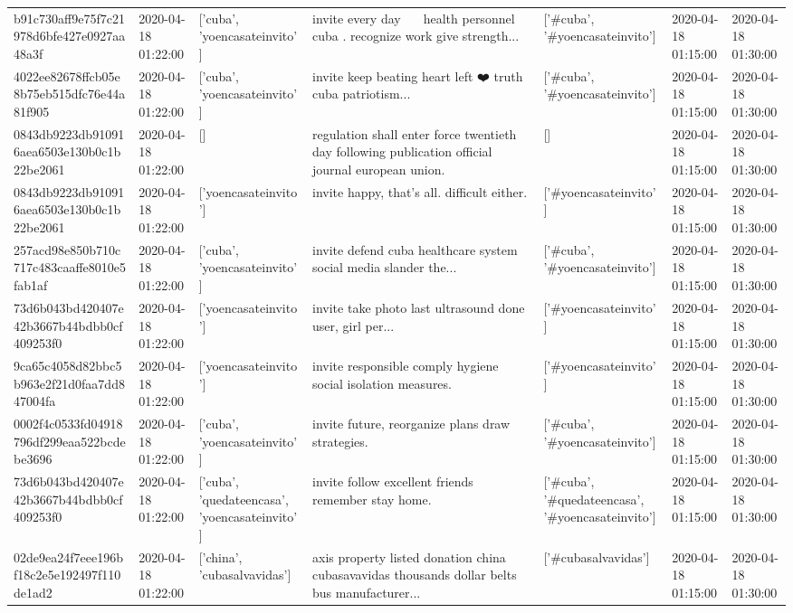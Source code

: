 \begin{tabular}{lllllll}
b91c730aff9e75f7c21978d6bfe427e0927aa48a3f & 2020-04-18 01:22:00 & ['cuba', 'yoencasateinvito'] & invite every day 👏👏👏👏 health personnel cuba ️. recognize work give strength... & ['#cuba', '#yoencasateinvito'] & 2020-04-18 01:15:00 & 2020-04-18 01:30:00 \\
4022ee82678ffcb05e8b75eb515dfc76e44a81f905 & 2020-04-18 01:22:00 & ['cuba', 'yoencasateinvito'] & invite keep beating heart left ❤️ truth cuba patriotism... & ['#cuba', '#yoencasateinvito'] & 2020-04-18 01:15:00 & 2020-04-18 01:30:00 \\
0843db9223db910916aea6503e130b0c1b22be2061 & 2020-04-18 01:22:00 & [] & regulation shall enter force twentieth day following publication official journal european union. & [] & 2020-04-18 01:15:00 & 2020-04-18 01:30:00 \\
0843db9223db910916aea6503e130b0c1b22be2061 & 2020-04-18 01:22:00 & ['yoencasateinvito'] & invite happy, that's all. difficult either. & ['#yoencasateinvito'] & 2020-04-18 01:15:00 & 2020-04-18 01:30:00 \\
257acd98e850b710c717c483caaffe8010e5fab1af & 2020-04-18 01:22:00 & ['cuba', 'yoencasateinvito'] & invite defend cuba healthcare system social media slander the... & ['#cuba', '#yoencasateinvito'] & 2020-04-18 01:15:00 & 2020-04-18 01:30:00 \\
73d6b043bd420407e42b3667b44bdbb0cf409253f0 & 2020-04-18 01:22:00 & ['yoencasateinvito'] & invite take photo last ultrasound done user, girl per... & ['#yoencasateinvito'] & 2020-04-18 01:15:00 & 2020-04-18 01:30:00 \\
9ca65c4058d82bbc5b963e2f21d0faa7dd847004fa & 2020-04-18 01:22:00 & ['yoencasateinvito'] & invite responsible comply hygiene social isolation measures. & ['#yoencasateinvito'] & 2020-04-18 01:15:00 & 2020-04-18 01:30:00 \\
0002f4c0533fd04918796df299eaa522bcdebe3696 & 2020-04-18 01:22:00 & ['cuba', 'yoencasateinvito'] & invite future, reorganize plans draw strategies. & ['#cuba', '#yoencasateinvito'] & 2020-04-18 01:15:00 & 2020-04-18 01:30:00 \\
73d6b043bd420407e42b3667b44bdbb0cf409253f0 & 2020-04-18 01:22:00 & ['cuba', 'quedateencasa', 'yoencasateinvito'] & invite follow excellent friends remember stay home. & ['#cuba', '#quedateencasa', '#yoencasateinvito'] & 2020-04-18 01:15:00 & 2020-04-18 01:30:00 \\
02de9ea24f7eee196bf18c2e5e192497f110de1ad2 & 2020-04-18 01:22:00 & ['china', 'cubasalvavidas'] & axis property listed donation china cubasavavidas thousands dollar belts bus manufacturer... & ['#cubasalvavidas'] & 2020-04-18 01:15:00 & 2020-04-18 01:30:00 \\

\end{tabular}
